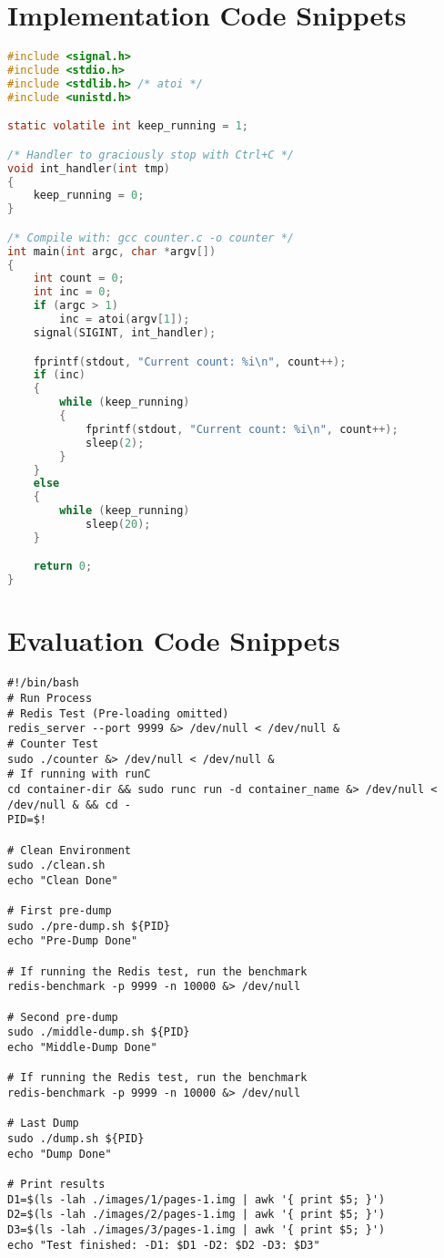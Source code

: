 \chapter{Implementation Code Snippets} \label{chap:app-code}

\begin{lstlisting}[language=C,caption={Simple counter in C.},label={code:c-counter}]
#include <signal.h>
#include <stdio.h>
#include <stdlib.h> /* atoi */
#include <unistd.h>

static volatile int keep_running = 1;

/* Handler to graciously stop with Ctrl+C */
void int_handler(int tmp)
{
    keep_running = 0;
}

/* Compile with: gcc counter.c -o counter */
int main(int argc, char *argv[])
{
    int count = 0;
    int inc = 0;
    if (argc > 1)
        inc = atoi(argv[1]);
    signal(SIGINT, int_handler);

    fprintf(stdout, "Current count: %i\n", count++);
    if (inc)
    {
        while (keep_running)
        {
            fprintf(stdout, "Current count: %i\n", count++);
            sleep(2);
        }
    }
    else 
    {
        while (keep_running)
            sleep(20);
    }

    return 0;
}
\end{lstlisting}

\chapter{Evaluation Code Snippets} \label{chap:app:evaluation}

\begin{lstlisting}[style=Bash,caption={Full evaluation script for the iterative migration micro-benchmark.\label{code:microbenchmark-iterative-evaluation}}]
#!/bin/bash
# Run Process
# Redis Test (Pre-loading omitted)
redis_server --port 9999 &> /dev/null < /dev/null &
# Counter Test
sudo ./counter &> /dev/null < /dev/null &
# If running with runC
cd container-dir && sudo runc run -d container_name &> /dev/null < /dev/null & && cd -
PID=$!

# Clean Environment
sudo ./clean.sh
echo "Clean Done"

# First pre-dump
sudo ./pre-dump.sh ${PID}
echo "Pre-Dump Done"

# If running the Redis test, run the benchmark
redis-benchmark -p 9999 -n 10000 &> /dev/null

# Second pre-dump
sudo ./middle-dump.sh ${PID}
echo "Middle-Dump Done"

# If running the Redis test, run the benchmark
redis-benchmark -p 9999 -n 10000 &> /dev/null

# Last Dump
sudo ./dump.sh ${PID}
echo "Dump Done"

# Print results
D1=$(ls -lah ./images/1/pages-1.img | awk '{ print $5; }')
D2=$(ls -lah ./images/2/pages-1.img | awk '{ print $5; }')
D3=$(ls -lah ./images/3/pages-1.img | awk '{ print $5; }')
echo "Test finished: -D1: $D1 -D2: $D2 -D3: $D3"
\end{lstlisting}
